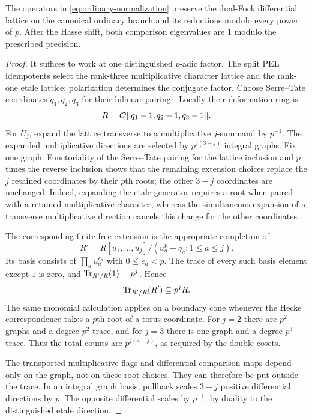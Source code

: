 \begin{lemma}
\label{lem:ordinary-trace}
The operators in \cref{eq:ordinary-normalization} preserve the
dual-Fock differential lattice on the canonical ordinary branch
and its reductions modulo every power of $p$.  After the Hasse
shift, both comparison eigenvalues are $1$ modulo the prescribed
precision.
\end{lemma}

\begin{proof}
It suffices to work at one distinguished $p$-adic factor.
The split PEL idempotents select the rank-three multiplicative
character lattice and the rank-one etale lattice; polarization
determines the conjugate factor.
Choose Serre--Tate coordinates $q_1,q_2,q_3$ for their bilinear pairing
\citep[Theorem~2.1(1),(2)]{Katz1981SerreTate}.  Locally
their deformation ring is
\[
 R=\mathcal O[[q_1-1,q_2-1,q_3-1]].
\]
For $U_j$, expand the lattice transverse to a multiplicative
$j$-summand by $p^{-1}$.  The expanded multiplicative directions
are selected by $p^{j(3-j)}$ integral graphs.  Fix one graph.
Functoriality of the Serre--Tate pairing
\citep[Theorem~2.1(4)]{Katz1981SerreTate} for the lattice inclusion
and $p$ times the reverse inclusion shows that the remaining
extension choices replace the $j$ retained coordinates by their
$p$th roots; the other $3-j$ coordinates are unchanged.  Indeed,
expanding the etale generator requires a root when paired with a
retained multiplicative character, whereas the simultaneous
expansion of a transverse multiplicative direction cancels this
change for the other coordinates.

The corresponding finite free extension is the appropriate
completion of
\[
 R'=R[u_1,\ldots,u_j]/(u_a^p-q_a:1\leq a\leq j).
\]
Its basis consists of $\prod_a u_a^{e_a}$ with $0\leq e_a<p$.
The trace of every such basis element except $1$ is zero, and
$\operatorname{Tr}_{R'/R}(1)=p^j$.  Hence
\begin{equation}
                    \operatorname{Tr}_{R'/R}(R')\subseteq p^jR.
 \label{eq:root-trace-divisibility}
\end{equation}
The same monomial calculation applies on a boundary cone whenever
the Hecke correspondence takes a $p$th root of a torus coordinate.
For $j=2$ there are $p^2$ graphs and a degree-$p^2$ trace, and for
$j=3$ there is one graph and a degree-$p^3$ trace.  Thus the total
counts are $p^{j(4-j)}$, as required by the double cosets.

The transported multiplicative flags and differential comparison
maps depend only on the graph, not on these root choices.  They
can therefore be put outside the trace.  In an integral graph
basis, pullback scales $3-j$ positive differential directions by
$p$.  The opposite differential scales by $p^{-1}$, by duality
to the distinguished etale direction.


\end{proof}
